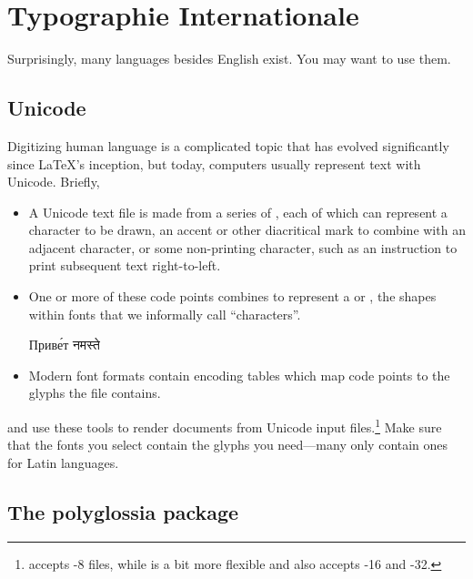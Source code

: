 \chapter{Typographie Internationale}
\label{i18n}

Surprisingly, many languages besides English exist.
You may want to use them.

\section{Unicode}

Digitizing human language is a complicated topic that has evolved significantly
since \LaTeX's inception, but today,
computers usually represent text with Unicode. Briefly,
\begin{itemize}
\item A Unicode text file is made from a series of ,
    each of which can represent a character to be drawn,
    an accent or other diacritical mark to combine with an adjacent
    character,
    or some non-printing character,
    such as an instruction to print subsequent text right-to-left.
\item One or more of these code points combines to represent a
     or ,
    the shapes within fonts that we informally call ``characters''\quotekern.
\begin{centerfigure}
\large%
%
Приве́т
\quad{}%
नमस्ते
\end{centerfigure}
\item Modern font formats contain encoding tables
    which map code points to the glyphs the file contains.
\end{itemize}
\LuaLaTeX{} and \XeLaTeX{} use these tools to render documents
from Unicode input
files.\punckern\footnote{\LuaLaTeX{} accepts \mbox{-8} files,
while \XeLaTeX{} is a bit more flexible and also
accepts \mbox{-16} and
\mbox{-32}.}
Make sure that the fonts you select contain the glyphs you need---many
only contain ones for Latin languages.

\section{The polyglossia package}

